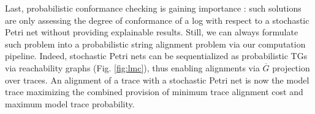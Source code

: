 Last, probabilistic conformance checking is gaining importance \cite{DBLP:conf/icpm/PolyvyanyyK19}: such solutions are only assessing the degree of conformance of a log with respect to a stochastic Petri net without providing explainable results. Still, we can always formulate such problem into a probabilistic string alignment problem via our computation pipeline. Indeed, stochastic Petri nets  can be sequentialized as probabilistic TGs via reachability graphs (Fig. \ref{fig:lmc}), thus enabling alignments via $\overline{G}$ projection over traces. An alignment of a trace with a stochastic Petri net is now the model trace maximizing the combined provision of minimum trace alignment cost and maximum model trace probability.









